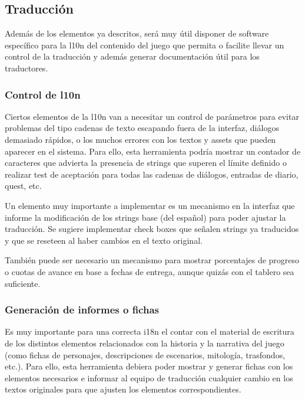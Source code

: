 
\subsection{Traducción}\label{kit:traduccion}

Además de los elementos ya descritos, será muy útil disponer de software específico para la l10n del contenido del juego que permita o facilite llevar un control de la traducción y además generar documentación útil para los traductores.

\subsubsection{Control de l10n}\label{kit:control-de-l10n}

Ciertos elementos de la l10n van a necesitar un control de parámetros para evitar problemas del tipo cadenas de texto escapando fuera de la interfaz, diálogos demasiado rápidos, o los muchos errores con los textos y assets que pueden aparecer en el sistema. Para ello, esta herramienta podría mostrar un contador de caracteres que advierta la presencia de strings que superen el límite definido o realizar test de aceptación para todas las cadenas de diálogos, entradas de diario, quest, etc.

Un elemento muy importante a implementar es un mecanismo en la interfaz que informe la modificación de los strings base (del español) para poder ajustar la traducción. Se sugiere implementar check boxes que señalen strings ya traducidos y que se reseteen al haber cambios en el texto original.

También puede ser necesario un mecanismo para mostrar porcentajes de progreso o cuotas de avance en base a fechas de entrega, aunque quizás con el tablero sea suficiente.

\subsubsection{Generación de informes o fichas}\label{kit:generacion-de-informes}

Es muy importante para una correcta i18n el contar con el material de escritura de los distintos elementos relacionados con la historia y la narrativa del juego (como fichas de personajes, descripciones de escenarios, mitología, trasfondos, etc.). Para ello, esta herramienta debiera poder mostrar y generar fichas con los elementos necesarios e informar al equipo de traducción cualquier cambio en los textos originales para que ajusten los elementos correspondientes.

